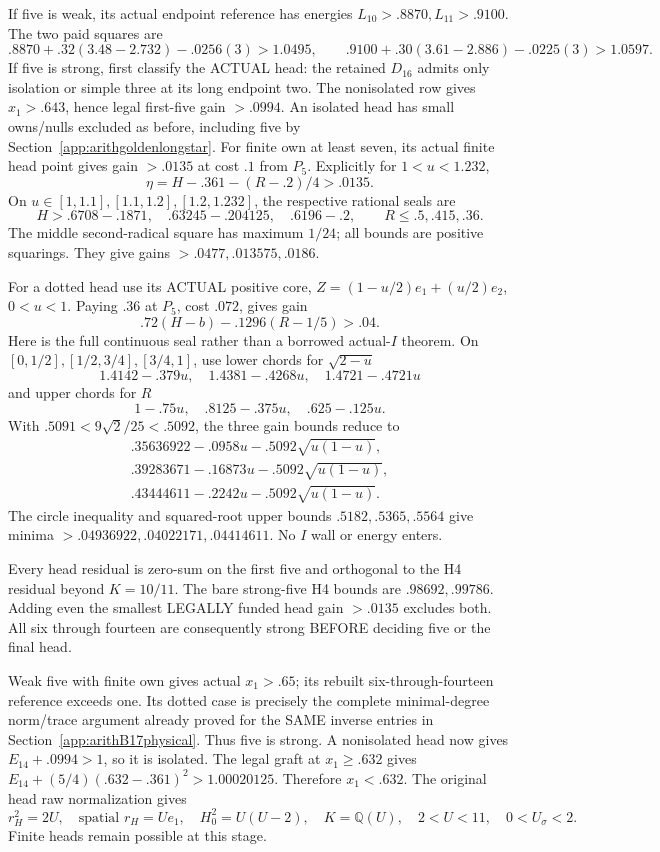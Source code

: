 \documentclass[11pt]{article}
\begin{document}
If five is weak, its actual endpoint reference
has energies \(L_{10}>.8870,L_{11}>.9100\).
The two paid squares are
\[
 .8870+.32(3.48-2.732)-.0256(3)>1.0495,\qquad
 .9100+.30(3.61-2.886)-.0225(3)>1.0597 .
\]
If five is strong, first classify the ACTUAL
head: the retained \(D_{16}\) admits only isolation
or simple three at its long endpoint two.
The nonisolated row gives \(x_1>.643\), hence
legal first-five gain \(>.0994\).
An isolated head has small owns/nulls excluded
as before, including five by
Section~\ref{app:arithgoldenlongstar}.
For finite own at least seven, its actual finite
head point gives gain \(>.0135\) at cost \(.1\)
from \(P_5\).
Explicitly for \(1<u<1.232\),
\[
 \eta=H-.361-(R-.2)/4>.0135 .
\]
On \(u\in[1,1.1],[1.1,1.2],[1.2,1.232]\),
the respective rational seals are
\[
 H>.6708-.1871,\quad .63245-.204125,\quad .6196-.2,
 \qquad R\le.5,.415,.36 .
\]
The middle second-radical square has maximum
\(1/24\); all bounds are positive squarings.
They give gains \(>.0477,.013575,.0186\).

For a dotted head use its ACTUAL positive core,
\(Z=(1-u/2)e_1+(u/2)e_2\), \(0<u<1\).
Paying \(.36\) at \(P_5\), cost \(.072\),
gives gain
\[
                .72(H-b)-.1296(R-1/5)>.04 .
\tag{D17H}\label{eq:arithD17dotgain}
\]
Here is the full continuous seal rather than a
borrowed actual-\(I\) theorem.
On \([0,1/2],[1/2,3/4],[3/4,1]\), use lower
chords for \(\sqrt{2-u}\)
\[
1.4142-.379u,\quad1.4381-.4268u,\quad1.4721-.4721u
\]
and upper chords for \(R\)
\[
1-.75u,\quad.8125-.375u,\quad.625-.125u.
\]
With \(.5091<9\sqrt2/25<.5092\), the three
gain bounds reduce to
\[
\begin{array}{l}
 .35636922-.0958u-.5092\sqrt{u(1-u)},\\
 .39283671-.16873u-.5092\sqrt{u(1-u)},\\
 .43444611-.2242u-.5092\sqrt{u(1-u)} .
\end{array}
\]
The circle inequality and squared-root upper
bounds \(.5182,.5365,.5564\) give minima
\(>.04936922,.04022171,.04414611\).
No \(I\) wall or energy enters.

Every head residual is zero-sum on the first
five and orthogonal to the H4 residual beyond
\(K=10/11\).
The bare strong-five H4 bounds are
\(.98692,.99786\).
Adding even the smallest LEGALLY funded head
gain \(>.0135\) excludes both.
All six through fourteen are consequently strong
BEFORE deciding five or the final head.

Weak five with finite own gives actual
\(x_1>.65\); its rebuilt six-through-fourteen
reference exceeds one.
Its dotted case is precisely the complete
minimal-degree norm/trace argument already
proved for the SAME inverse entries in
Section~\ref{app:arithB17physical}.
Thus five is strong.
A nonisolated head now gives
\(E_{14}+.0994>1\), so it is isolated.
The legal graft at \(x_1\ge.632\) gives
\(E_{14}+(5/4)(.632-.361)^2>1.00020125\).
Therefore \(x_1<.632\).
The original head raw normalization gives
\[
 r_H^2=2U,\quad\text{spatial }r_H=Ue_1,\quad
 H_0^2=U(U-2),\quad K=\mathbb Q(U),\quad
               2<U<11,\quad0<U_\sigma<2 .
\]
Finite heads remain possible at this stage.
\end{document}
